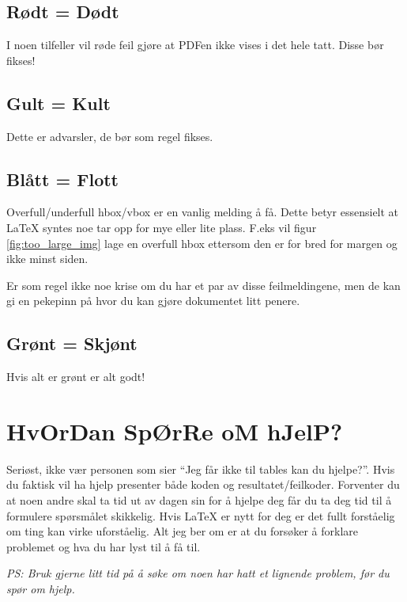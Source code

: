     \subsection{Rødt = Dødt}
        I noen tilfeller vil røde feil gjøre at PDFen ikke vises i det hele tatt. Disse bør fikses!
    \subsection{Gult = Kult}
        Dette er advarsler, de bør som regel fikses. 
    \subsection{Blått = Flott}
        Overfull/underfull hbox/vbox er en vanlig melding å få. Dette betyr essensielt at \LaTeX{} syntes noe tar opp for mye eller lite plass. F.eks vil figur \ref{fig:too_large_img} lage en overfull hbox ettersom den er for bred for margen og ikke minst siden. 
        
        Er som regel ikke noe krise om du har et par av disse feilmeldingene, men de kan gi en pekepinn på hvor du kan gjøre dokumentet litt penere.
    \subsection{Grønt = Skjønt}
        Hvis alt er grønt er alt godt!



\section{HvOrDan SpØrRe oM hJelP?}
    Seriøst, ikke vær personen som sier ``Jeg får ikke til tables kan du hjelpe?''. 
    Hvis du faktisk vil ha hjelp presenter både koden og resultatet/feilkoder.
    Forventer du at noen andre skal ta tid ut av dagen sin for å hjelpe deg får du ta deg tid til å formulere spørsmålet skikkelig. Hvis \LaTeX{} er nytt for deg er det fullt forståelig om ting kan virke uforståelig. Alt jeg ber om er at du forsøker å forklare problemet og hva du har lyst til å få til.
    
    \textit{PS: Bruk gjerne litt tid på å søke om noen har hatt et lignende problem, før du spør om hjelp.}

